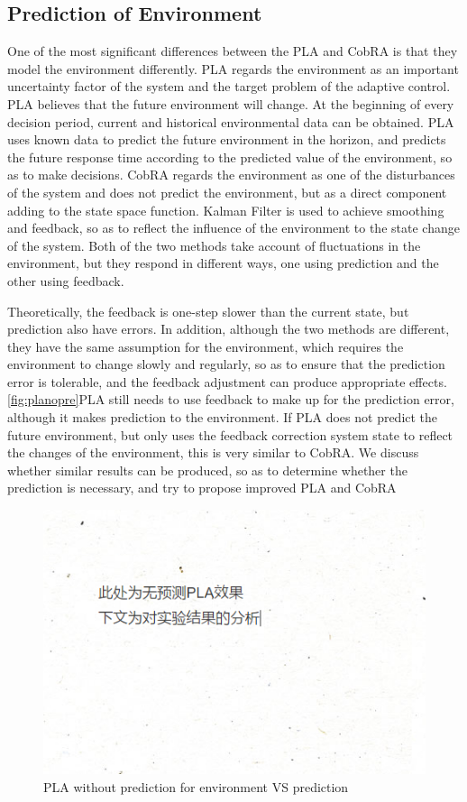 \documentclass[sigconf]{acmart}
\begin{document}
\subsection{Prediction of Environment}
One of the most significant differences between the PLA and CobRA is that they model the environment differently.
PLA regards the environment as an important uncertainty factor of the system and the target problem of the adaptive control.
PLA believes that the future environment will change. At the beginning of every decision period, current and historical environmental data can be obtained. PLA uses known data to predict the future environment in the horizon, and predicts the future response time according to the predicted value of the environment, so as to make decisions.
CobRA regards the environment as one of the disturbances of the system and does not predict the environment, but as a direct component adding to the state space function.
Kalman Filter is used to achieve smoothing and feedback, so as to reflect the influence of the environment to the state change of the system.
Both of the two methods take account of fluctuations in the environment, but they respond in different ways, one using prediction and the other using feedback.

Theoretically, the feedback is one-step slower than the current state, but prediction also have errors.
In addition, although the two methods are different, they have the same assumption for the environment, which requires the environment to change slowly and regularly, so as to ensure that the prediction error is tolerable, and the feedback adjustment can produce appropriate effects.
\ref{fig:planopre}PLA still needs to use feedback to make up for the prediction error, although it makes prediction to the environment. If PLA does not predict the future environment, but only uses the feedback correction system state to reflect the changes of the environment, this is very similar to CobRA. We discuss whether similar results can be produced, so as to determine whether the prediction is necessary, and try to propose improved PLA and CobRA
\begin{figure}[h]
	\centering
		\includegraphics[width=\linewidth]{planopre}
	\caption{PLA without prediction for environment VS prediction}
\end{figure}
\end{document}
